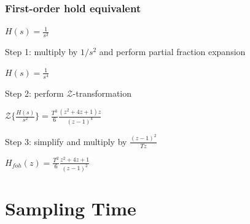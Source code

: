 \begin{frame}
	\frametitle{First-order hold equivalent}
	\begin{example}
		\begin{center}
			$H(s) = \frac{1}{s^{2}}$
		\end{center}
		Step 1: multiply by $1/s^{2}$ and perform partial fraction expansion
		\begin{center}
			$H(s) = \frac{1}{s^{4}}$
		\end{center}
		Step 2: perform $\mathcal{Z}$-transformation
		\begin{center}
			$\mathcal{Z}\{\frac{H(s)}{s^{2}}\} = \frac{T^{3}}{6} \frac{(z^{2} + 4z +1) z}{(z-1)^{4}}$
		\end{center}
		Step 3: simplify and multiply by $\frac{(z-1)^{2}}{Tz}$
		\begin{center}
			$H_{foh}(z) = \frac{T^{2}}{6} \frac{z^{2} + 4z + 1}{(z-1)^{2}}$
		\end{center}
	\end{example}
\end{frame}

\section{Sampling Time}

